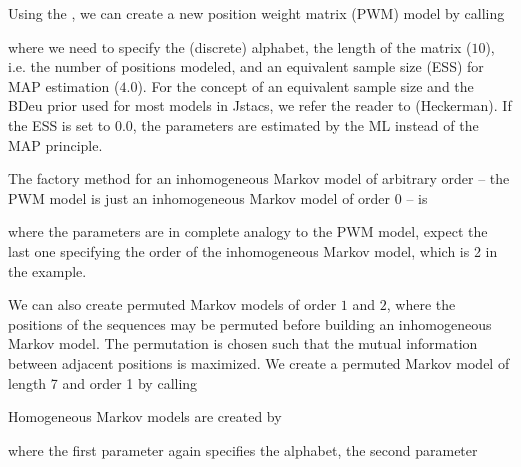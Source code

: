 Using the \TrainSMFactory, we can create a new position weight matrix (PWM) model by calling
\addtocounter{off}{10}
where we need to specify the (discrete) alphabet, the length of the matrix ($10$), i.e. the number of positions modeled, and an equivalent sample size (ESS) for MAP estimation ($4.0$). For the concept of an equivalent sample size and the BDeu prior used for most models in Jstacs, we refer the reader to (Heckerman). If the ESS is set to $0.0$, the parameters are estimated by the ML instead of the MAP principle.

The factory method for an inhomogeneous Markov model of arbitrary order -- the PWM model is just an inhomogeneous Markov model of order 0 -- is
\addtocounter{off}{1}
where the parameters are in complete analogy to the PWM model, expect the last one specifying the order of the inhomogeneous Markov model, which is 2 in the example.

We can also create permuted Markov models of order $1$ and $2$, where the positions of the sequences may be permuted before building an inhomogeneous Markov model. The permutation is chosen such that the mutual information between adjacent positions is maximized. We create a permuted Markov model of length 7 and order 1 by calling
\addtocounter{off}{1}

Homogeneous Markov models are created by
\addtocounter{off}{1}
where the first parameter again specifies the alphabet, the second parameter 

\subsection{\DiffSM}